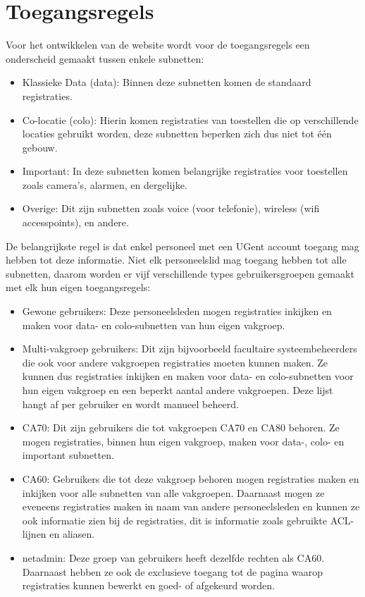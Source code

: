 \section{Toegangsregels}
\label{toegangsregels}
Voor het ontwikkelen van de website wordt voor de toegangsregels een onderscheid gemaakt tussen enkele subnetten: 
\begin{itemize}
    \item Klassieke Data (data): Binnen deze subnetten komen de standaard registraties.
    \item Co-locatie (colo): Hierin komen registraties van toestellen die op verschillende locaties gebruikt worden, deze subnetten beperken zich dus niet tot één gebouw.
    \item Important: In deze subnetten komen belangrijke registraties voor toestellen zoals camera's, alarmen, en dergelijke.
    \item Overige: Dit zijn subnetten zoals voice (voor telefonie), wireless (wifi accesspoints), en andere.
\end{itemize} 
De belangrijkste regel is dat enkel personeel met een UGent account toegang mag hebben tot deze informatie.
Niet elk personeelslid mag toegang hebben tot alle subnetten, daarom worden er vijf verschillende types gebruikersgroepen gemaakt met elk hun eigen toegangsregels:
\begin{itemize}
    \item Gewone gebruikers: Deze personeelsleden mogen registraties inkijken en maken voor data- en colo-subnetten van hun eigen vakgroep.
    \item Multi-vakgroep gebruikers: Dit zijn bijvoorbeeld facultaire systeembeheerders die ook voor andere vakgroepen registraties moeten kunnen maken. Ze kunnen dus registraties inkijken en maken voor data- en colo-subnetten voor hun eigen vakgroep en een beperkt aantal andere vakgroepen. Deze lijst hangt af per gebruiker en wordt manueel beheerd.
    \item CA70: Dit zijn gebruikers die tot vakgroepen CA70 en CA80 behoren. Ze mogen registraties, binnen hun eigen vakgroep, maken voor data-, colo- en important subnetten.
    \item CA60: Gebruikers die tot deze vakgroep behoren mogen registraties maken en inkijken voor alle subnetten van alle vakgroepen. Daarnaast mogen ze eveneens registraties maken in naam van andere personeelsleden en kunnen ze ook informatie zien bij de registraties, dit is informatie zoals gebruikte ACL-lijnen en aliasen.
    \item netadmin: Deze groep van gebruikers heeft dezelfde rechten als CA60. Daarnaast hebben ze ook de exclusieve toegang tot de pagina waarop registraties kunnen bewerkt en goed- of afgekeurd worden.
\end{itemize}

